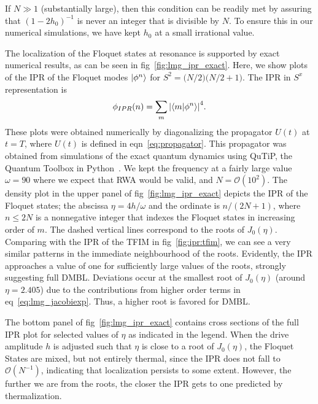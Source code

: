 \documentclass[%
reprint,
superscriptaddress,
amsmath,amssymb,
aps,
prb,
showkeys,
]{revtex4-2}
\begin{document}
	If $N\gg 1$ (substantially large), then this condition can be readily met by assuring that $(1-2h_0)^{-1}$ is never an integer that is divisible by $N$. To ensure this in our numerical simulations, we have kept $h_0$ at a small irrational value.
		
		The localization of the Floquet states at resonance is supported by exact numerical results, as can be seen in fig~\ref{fig:lmg_ipr_exact}. Here, we show plots of the IPR of the Floquet modes $\ket{\phi^n}$ for $S^2 = \big(N/2\big)\big(N/2 + 1\big)$. The IPR in $S^x$ representation is
	\begin{equation}
	\phi_{IPR}(n) = \sum_m \abs{\ip{m}{\phi^n}}^4.
	\label{eq:ipr:lmg}
	\end{equation}
	 These plots were obtained numerically by diagonalizing the propagator $U(t)$ at $t=T$, where $U(t)$ is defined in eqn~\ref{eq:propagator}. This propagator was obtained from simulations of the exact quantum dynamics using QuTiP, the Quantum Toolbox in Python~\cite{qutip}. We kept the frequency at a fairly large value $\omega = 90$ where we expect that RWA would be valid, and $N=\mathcal{O}(10^2)$. The density plot in the upper panel of fig~\ref{fig:lmg_ipr_exact} depicts the IPR of the Floquet states; the abscissa  $\eta=4h/\omega$ and the ordinate is $n/(2N+1)$, where $n\leq 2N$ is a nonnegative integer that indexes the Floquet states in increasing order of $m$. The dashed vertical lines correspond to the roots of $J_0(\eta)$. Comparing with the IPR of the TFIM in fig~\ref{fig:ipr:tfim}, we can see a very similar patterns in the immediate neighbourhood of the roots. Evidently, the IPR approaches a value of one for sufficiently large values of the roots, strongly suggesting full DMBL. Deviations occur at the smallest root of $J_0(\eta)$ (around $\eta = 2.405$) due to the contributions from higher order terms in eq~\ref{eq:lmg_jacobiexp}. Thus, a higher root is favored for DMBL.
	
	The bottom panel of fig~\ref{fig:lmg_ipr_exact} contains cross sections of the full IPR plot for selected values of $\eta$ as indicated in the legend. When the drive amplitude $h$ is adjusted such that $\eta$ is close to a root of $J_0(\eta)$, the Floquet States are mixed, but not entirely thermal, since the IPR does not fall to $\mathcal{O}(N^{-1})$, indicating that localization persists to some extent. However, the further we are from the roots, the closer the IPR gets to one predicted by thermalization.
	
\end{document}
